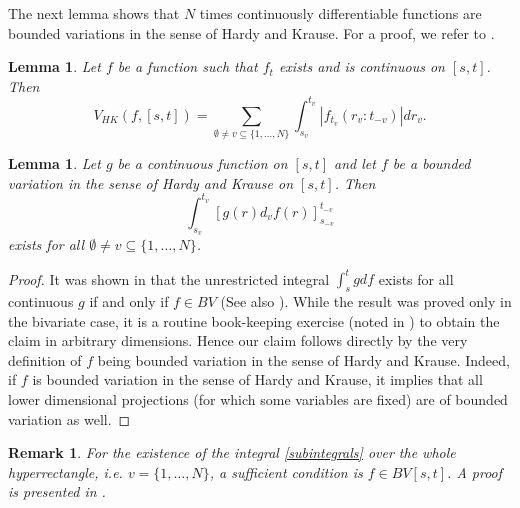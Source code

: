 \documentclass[english, a4paper, 12pt,reqno]{amsart}
\newtheorem{lemma}[defi]{Lemma}
\newtheorem{rem}[defi]{Remark}
\begin{document}
The next lemma shows that $N$ times continuously differentiable functions are bounded variations in the sense of Hardy and Krause. For a proof, we refer to \cite{owen2005multidimensional}.
\begin{lemma}
\label{lemma:variationofdifferentiable}
Let $f$ be a function such that $f_t$ exists and is continuous on $[s,t]$. Then
\begin{equation*}
V_{HK}(f, [s,t]) = \sum_{\emptyset\neq v\subseteq \{1,\dots,N\}} \int_{s_v}^{t_v} \left|f_{t_v}(r_v:t_{-v})\right| dr_v.
\end{equation*}
\end{lemma}
\begin{lemma}
\label{lemma:existence}
Let $g$ be a continuous function on $[s,t]$ and let $f$ be a bounded variation in the sense of Hardy and Krause on $[s,t]$. Then 
\begin{equation}
\label{subintegrals}
\int_{s_v}^{t_v}[g(r) d_vf(r)]_{s_{-v}}^{t_{-v}}
\end{equation}
exists for all $\emptyset \neq v \subseteq \{1,\dots,N\}$.
\end{lemma}
\begin{proof}
It was shown in \cite{clarkson1933double} that the unrestricted integral $\int_s^t gdf$ exists for all continuous $g$ if and only if $f\in BV$ (See also \cite{sard1963linear}). While the result was proved only in the bivariate case, it is a routine book-keeping exercise (noted in \cite{clarkson1933double}) to obtain the claim in arbitrary dimensions. Hence our claim follows directly by the very definition of $f$ being bounded variation in the sense of Hardy and Krause. Indeed, if $f$ is bounded variation in the sense of Hardy and Krause, it implies that all lower dimensional projections (for which some variables are fixed) are of bounded variation as well.
\end{proof}
\begin{rem}
\label{rem:existence2}
For the existence of the integral \eqref{subintegrals} over the whole hyperrectangle, i.e. $v = \{1,\dots,N\}$, a sufficient condition is $f\in BV[s,t]$. A proof is presented in \cite{prause2015sequential}.
\end{rem}
\end{document}
